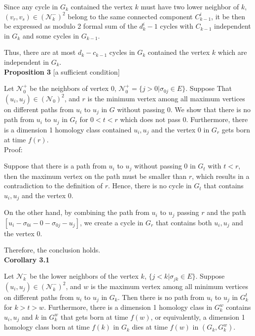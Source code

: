 \documentclass[a4paper,12pt]{article}
\numberwithin{equation}{section}
\begin{document}
	Since any cycle in $G_k$ contained the vertex $k$ must have two lower neighbor of $k$, $(v_r,v_s) \in (\mathcal{N}_k^-)^2$ belong to the same connected component $C_{k-1}^i$, it be then be expressed as modulo 2 formal sum of the $d^i_k -1$ cycles with $C_{k-1}$ independent in $G_k$ and some cycles in $G_{k-1}$. 
	
	Thus, there are at most $d_k - c_{k-1}$ cycles in $G_k$ contained the vertex $k$ which are independent in $G_k$.\\
	

	
	
	\noindent \textbf{Proposition 3} [a sufficient condition]
	
	Let $\mathcal{N}^+_0$ be the neighbors of vertex $0$, $\mathcal{N}^+_0 = \{j >0 \vert \sigma_{0j} \in E\}$. Suppose That $(u_i, u_j) \in (\mathcal{N}_0)^2$, and $r$ is the minimum vertex among all maximum vertices on different paths from $u_i$ to $u_j$ in $G$ without passing $0$. We show that there is no path from $u_i$ to $u_j$ in $G_t$ for $0< t< r$ which does not pass $0$. Furthermore, there is a dimension 1 homology class contained $u_i, u_j$ and the vertex $0$ in $G_r$ gets born at time $f(r)$.\\
	
	\noindent Proof:
	
	Suppose that there is a path from $u_i$ to $u_j$ without passing $0$ in $G_t$ with $t<r$, then the maximum vertex on the path must be smaller than $r$, which results in a contradiction to the definition of $r$. Hence, there is no cycle in $G_t$ that contains $u_i, u_j$ and the vertex $0$. 
	
	On the other hand, by combining the path from $u_i$ to $u_j$ passing $r$ and the path $[u_i - \sigma_{0i} - 0 - \sigma_{0j} - u_j]$, we create a cycle in $G_r$ that contains both $u_i, u_j$ and the vertex $0$. 
	
	Therefore, the conclusion holds.\\
	
	\noindent \textbf{Corollary 3.1}

	Let $\mathcal{N}_k^-$ be the lower neighbors of the vertex $k$, $\{j<k \vert \sigma_{jk} \in E \}$. Suppose $(u_i,u_j) \in (\mathcal{N}_k^-)^2$, and $w$ is the maximum vertex among all minimum vertices on different paths from $u_i$ to $u_j$ in $G_k$. Then there is no path from $u_i$ to $u_j$ in $G^t_k$ for $k>t>w$. Furthermore, there is a dimension 1 homology class in $G^w_k$ contains $u_i, u_j$ and $k$ in $G^w_k$ that gets born at time $f(w)$, or equivalently, a dimension 1 homology class born at time $f(k)$ in $G_k$ dies at time $f(w)$ in $(G_k,G^w_k)$.\\
	
\end{document}
